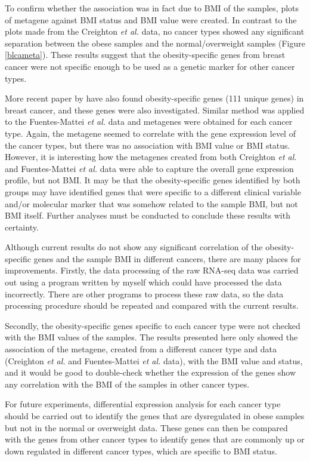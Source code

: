 \documentclass[12pt, a4paper]{article}
\begin{document}
To confirm whether the association was in fact due to BMI of the samples, plots of metagene against BMI status and BMI value were created.
In contrast to the  plots made from the Creighton \textit{et al.} data, no cancer types showed any significant separation between the obese samples and the normal/overweight samples (Figure \ref{blcameta}).
These results suggest that the obesity-specific genes from breast cancer were not specific enough to be used as a genetic marker for other cancer types.

More recent paper by \citet{Fuentes-Mattei2014} have also found  obesity-specific genes (111 unique genes) in breast cancer, and these genes were also investigated.
Similar method was applied to the Fuentes-Mattei \textit{et al.} data and metagenes were obtained for each cancer type.
Again, the metagene seemed to correlate with the gene expression level of the cancer types, but there was no association with BMI value or BMI status.
However, it is interesting how the metagenes created from both Creighton \textit{et al.} and Fuentes-Mattei \textit{et al.} data were able to capture the overall gene expression profile, but not BMI.
It may be that the obesity-specific genes identified by both groups may have identified genes that were specific to a different clinical variable and/or molecular marker that was somehow related to the sample BMI, but not BMI itself.
Further analyses must be conducted to conclude these results with certainty.

Although current results do not show any significant correlation of the obesity-specific genes and the sample BMI in different cancers, there are many places for improvements.
Firstly, the data processing of the raw RNA-seq data was carried out using a program written by myself which could have processed the data incorrectly.
There are other programs to process these raw data, so the data processing procedure should be repeated and compared with the current results.

Secondly, the obesity-specific genes specific to each cancer type were not checked with the BMI values of the samples.
The results presented here only showed the association of the metagene, created from a different cancer type and data (Creighton \textit{et al.} and Fuentes-Mattei \textit{et al.} data), with the BMI value and status, and it would be good to double-check whether the expression of the genes show any correlation with the BMI of the samples in other cancer types.

For future experiments, differential expression analysis for each cancer type should be carried out to identify the genes that are dysregulated in obese samples but not in the normal or overweight data.
These genes can then be compared with the genes from other cancer types to identify genes that are  commonly up or down regulated in different cancer types, which are specific to BMI status.


\vspace{-11pt}



\end{document}
